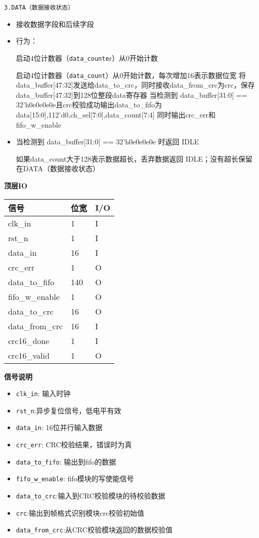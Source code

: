 \documentclass[12pt,]{article}
\providecommand{\tightlist}{%
  \setlength{\itemsep}{0pt}\setlength{\parskip}{0pt}}
\begin{document}
\texttt{3.\hspace{0pt}DATA\hspace{0pt}（数据接收状态）}

\begin{itemize}
\item
  接收数据字段和后续字段
\item
  行为：

  启动4位计数器（\texttt{data\_counte}r）从0开始计数

  启动4位计数器（\texttt{data\_count}）从0开始计数，每次增加16表示数据位宽
    将data\_buffer[47:32]发送给data\_to\_crc，同时接收data\_from\_crc为crc，保存data\_buffer[47:32]到128位整段data寄存器
    当检测到 data\_buffer[31:0] == 32'h0e0e0e0e且crc校验成功输出data\_to\_fifo为{data[15:0],112'd0,ch\_sel[7:0],data\_count[7:4]} 同时输出crc\_err和fifo\_w\_enable
\item
  当检测到 data\_buffer[31:0] == 32'h0e0e0e0e 时返回 IDLE

  如果data\_count大于128表示数据超长，丢弃数据返回 IDLE；没有超长保留在 ​DATA​（数据接收状态）
\end{itemize}


\textbf{顶层IO}

\begin{longtable}[]{@{}lll@{}}
\toprule\noalign{}
信号 & 位宽 & I/O \\
\midrule\noalign{}
\endhead
\bottomrule\noalign{}
\endlastfoot
clk\_in & 1 & I \\
rst\_n & 1 & I \\
data\_in & 16 & I \\
crc\_err & 1 & O \\
data\_to\_fifo & 140 & O \\
fifo\_w\_enable & 1 & O \\
data\_to\_crc & 16 & O \\
data\_from\_crc & 16 & I \\
crc16\_done & 1 & I \\
crc16\_valid & 1 & O \\
\end{longtable}

\textbf{信号说明}

\begin{itemize}
\tightlist
\item
  \texttt{clk\_in}: 输入时钟
\item
  \texttt{rst\_n}:异步复位信号，低电平有效
\item
  \texttt{data\_in}: 16位并行输入数据
\item
  \texttt{crc\_err}: CRC校验结果，错误时为真
\item
  \texttt{data\_to\_fifo}: 输出到fifo的数据
\item
  \texttt{fifo\_w\_enable}: fifo模块的写使能信号
\item
  \texttt{data\_to\_crc}:输入到CRC校验模块的待校验数据
\item
  \texttt{crc}:输出到帧格式识别模块crc校验初始值
\item
  \texttt{data\_from\_crc}:从CRC校验模块返回的数据校验值
\end{itemize}
\end{document}
